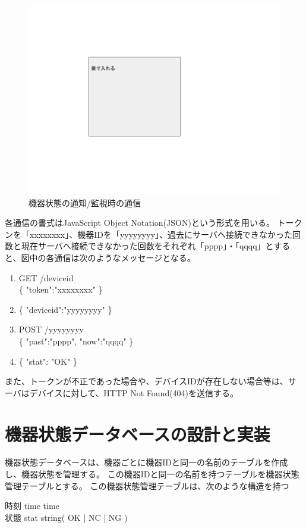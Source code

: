 \begin{figure}[htbp]
\includegraphics[width=16cm]{images/test.png}
\caption{機器状態の通知/監視時の通信}
\label{fig:blockdiagram}
\end{figure}

各通信の書式はJavaScript Object Notation(JSON)という形式を用いる。
トークンを「xxxxxxxx」、機器IDを「yyyyyyyy」、過去にサーバへ接続できなかった回数と現在サーバへ接続できなかった回数をそれぞれ「pppp」・「qqqq」とすると、図中の各通信は次のようなメッセージとなる。
\begin{enumerate}
\item GET /deviceid\\
	\{ "token":"xxxxxxxx" \}
\item \{ "deviceid":"yyyyyyyy" \}
\item POST /yyyyyyyy\\
	\{ "past":"pppp", "now":"qqqq" \}
\item \{ "stat": "OK" \}
\end{enumerate}
また、トークンが不正であった場合や、デバイスIDが存在しない場合等は、サーバはデバイスに対して、HTTP Not Found(404)を送信する。


\section{機器状態データベースの設計と実装}
機器状態データベースは、機器ごとに機器IDと同一の名前のテーブルを作成し、機器状態を管理する。
この機器IDと同一の名前を持つテーブルを機器状態管理テーブルとする。
この機器状態管理テーブルは、次のような構造を持つ

時刻 time time\\
状態 stat string( OK | NC | NG )\\

